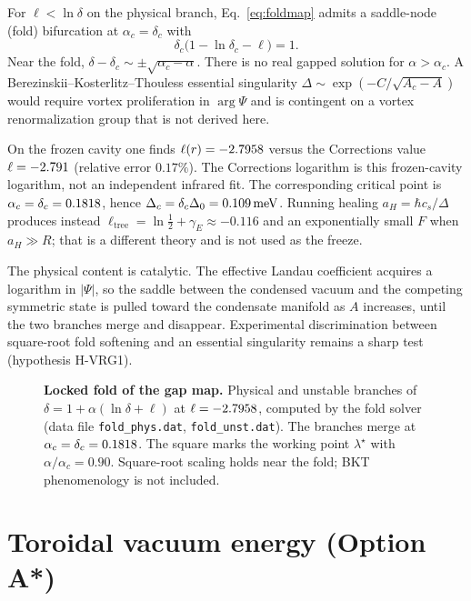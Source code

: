 \documentclass[11pt,letterpaper]{article}
\begin{document}
\begin{theorem}
\label{thm:fold}
For $\ell<\ln\delta$ on the physical branch, Eq.~\eqref{eq:foldmap} admits a saddle-node (fold) bifurcation at $\alpha_c=\delta_c$ with
\begin{equation}
\delta_c\bigl(1-\ln\delta_c-\ell\bigr)=1.
\end{equation}
Near the fold, $\delta-\delta_c\sim\pm\sqrt{\alpha_c-\alpha}$. There is no real gapped solution for $\alpha>\alpha_c$. A Berezinskii--Kosterlitz--Thouless essential singularity $\Delta\sim\exp(-C/\sqrt{A_c-A})$~\cite{Berezinskii1971,Kosterlitz1973} would require vortex proliferation in $\arg\Psi$ and is contingent on a vortex renormalization group that is not derived here.
\end{theorem}

On the frozen cavity one finds $\ell(r)=-2.7958$ versus the Corrections value $\ell=-2.791$ (relative error $0.17\%$). The Corrections logarithm is this frozen-cavity logarithm, not an independent infrared fit. The corresponding critical point is $\alpha_c=\delta_c=0.1818$, hence $\Delta_c=\delta_c\Delta_0=0.109\,\mathrm{meV}$. Running healing $a_H=\hbar c_s/\Delta$ produces instead $\ell_{\mathrm{tree}}=\ln\tfrac12+\gamma_E\approx-0.116$ and an exponentially small $F$ when $a_H\gg R$; that is a different theory and is not used as the freeze.

The physical content is catalytic. The effective Landau coefficient acquires a logarithm in $|\Psi|$, so the saddle between the condensed vacuum and the competing symmetric state is pulled toward the condensate manifold as $A$ increases, until the two branches merge and disappear. Experimental discrimination between square-root fold softening and an essential singularity remains a sharp test (hypothesis H-VRG1).

\begin{figure}[H]
\centering

\caption{\textbf{Locked fold of the gap map.} Physical and unstable branches of $\delta=1+\alpha(\ln\delta+\ell)$ at $\ell=-2.7958$, computed by the fold solver (data file \texttt{fold\_phys.dat}, \texttt{fold\_unst.dat}). The branches merge at $\alpha_c=\delta_c=0.1818$. The square marks the working point $\lambda^\star$ with $\alpha/\alpha_c=0.90$. Square-root scaling holds near the fold; BKT phenomenology is not included.}
\label{fig:fold}
\end{figure}

\section{Toroidal vacuum energy (Option A*)}
\label{sec:vacuum}
\end{document}
